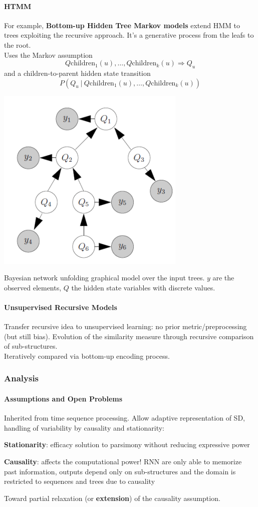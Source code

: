 \documentclass[10pt]{report}
\begin{document}
\paragraph{HTMM} For example, \textbf{Bottom-up Hidden Tree Markov models} extend HMM to trees exploiting the recursive approach. It's a generative process from the leafs to the root.\\
Uses the Markov assumption $$Q\text{children}_1(u),\ldots,Q\text{children}_k(u)\Rightarrow Q_u$$ and a children-to-parent hidden state transition$$P(Q_u\:|\:Q\text{children}_1(u),\ldots,Q\text{children}_k(u))$$
\begin{center}
	\includegraphics[scale=0.5]{46.png}
\end{center}
Bayesian network unfolding graphical model over the input trees. $y$ are the observed elements, $Q$ the hidden state variables with discrete values.
\paragraph{Unsupervised Recursive Models} Transfer recursive idea to unsupervised learning: no prior metric/preprocessing (but still bias). Evolution of the similarity measure through recursive comparison of sub-structures.\\
Iteratively compared via bottom-up encoding process.
\subsubsection{Analysis}
\paragraph{Assumptions and Open Problems} Inherited from time sequence processing. Allow adaptive representation of SD, handling of variability by causality and stationarity:
\begin{list}{}{}
	\item \textbf{Stationarity}: efficacy solution to parsimony without reducing expressive power
	\item \textbf{Causality}: affects the computational power! RNN are only able to memorize past information, outputs depend only on sub-structures and the domain is restricted to sequences and trees due to causality
\end{list}
Toward partial relaxation (or \textbf{extension}) of the causality assumption.
\end{document}
